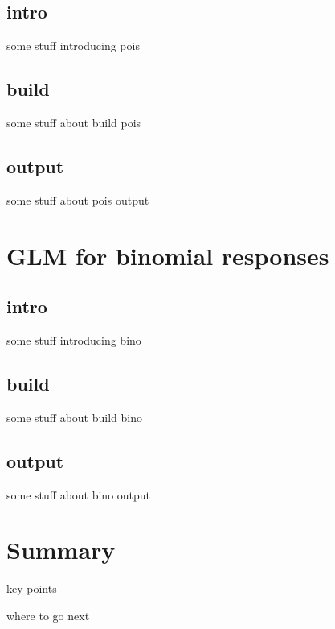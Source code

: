\documentclass[
]{book}
\begin{document}
\hypertarget{pois-intro}{%
\section{intro}\label{pois-intro}}

some stuff introducing pois

\hypertarget{pois-build}{%
\section{build}\label{pois-build}}

some stuff about build pois

\hypertarget{pois-output}{%
\section{output}\label{pois-output}}

some stuff about pois output

\hypertarget{bino}{%
\chapter{GLM for binomial responses}\label{bino}}

\hypertarget{bino-intro}{%
\section{intro}\label{bino-intro}}

some stuff introducing bino

\hypertarget{bino-build}{%
\section{build}\label{bino-build}}

some stuff about build bino

\hypertarget{bino-output}{%
\section{output}\label{bino-output}}

some stuff about bino output

\hypertarget{summary}{%
\chapter{Summary}\label{summary}}

key points

where to go next

  
\end{document}
